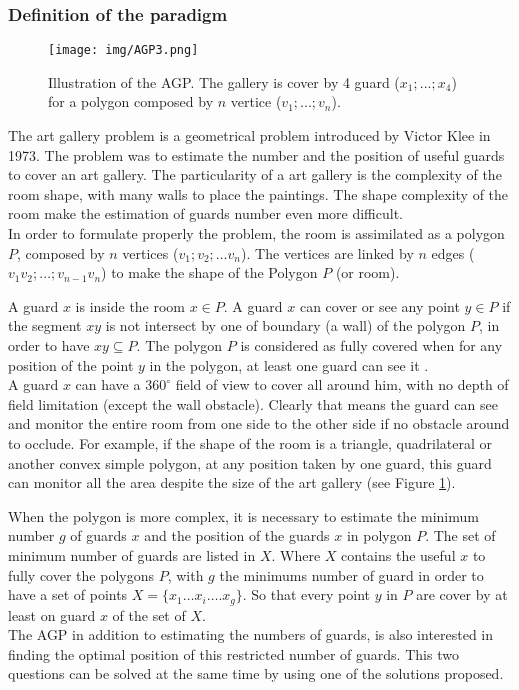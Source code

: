 	\subsubsection{Definition of the paradigm} \label{sec:AGPdef}
	\begin{figure}[t!]
\center
{}
   \texttt{[image: img/AGP3.png]}
  \caption{Illustration of the AGP. The gallery is cover by  4 guard ($x_1;...;x_4$) for a polygon  composed by $n$ vertice ($v_1;...;v_n$).}\label{fig:AGP}
  \endminipage\hfill
\end{figure}
	The art gallery problem is a geometrical problem introduced by Victor Klee in 1973. The problem was to estimate the number and the position of useful guards to cover an art gallery. 
The particularity of a art gallery is the complexity of the room shape, with many walls to place the paintings. The shape complexity of the room make the estimation of guards number even more difficult.\\
In order to formulate properly the problem, the room is assimilated as a polygon $P$, composed by $n$ vertices ($v_1; v_2;…v_n$). The vertices are linked by $n$ edges ($v_1 v_2;…; v_{n-1} v_n$) to make the shape of the Polygon $P$ (or room).

A guard $x$ is inside the room $x \in P$. A guard $x$ can cover or see any point $y \in P$ if the segment $xy$ is not intersect by one of boundary (a wall) of the polygon $P$, in order to have $ xy \subseteq P$.
The polygon $P$ is considered as fully covered when for any position of the point $y$ in the polygon, at least one guard can see it .\\
A guard $x$ can have a $360^\circ$ field of view to cover all around him, with no depth of field limitation (except the wall obstacle). Clearly that means the guard can see and monitor the entire room from one side to the other side if no obstacle around to occlude. For example, if the shape of the room is a triangle, quadrilateral or another convex simple polygon, at any position taken by one guard, this guard can monitor all the area despite the size of the art gallery (see Figure \ref{fig:AGP}). 

When the polygon is more complex, it is necessary to estimate the minimum number $g$ of guards $x$ and the position of the guards $x$ in polygon $P$. 
 The set of minimum number of guards are listed in $X$. Where $X$ contains the useful $x$ to fully cover the polygons $P$, with $g$ the minimums number of guard in order to have a set of points $X=\{x_1…x_i…. x_g\}$. So that every point $y$ in $P$  are cover by at least on guard $x$ of the set of $X$. \\
The AGP in addition to estimating the numbers of guards,  is also interested in finding the optimal position of this restricted number of guards. 
This two questions can be solved at the same time by using one of the solutions proposed.


